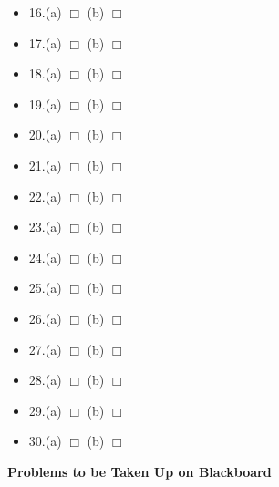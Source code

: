 \documentclass[12pt]{article}
\begin{document}
\begin{minipage}[t]{\textwidth}
\begin{multicols}{2}
\begin{mdframed}
\begin{multicols}{2}
\begin{itemize}
	\setlength\itemsep{0em}	
	\item{16.(a) $\Box$ \hspace{0.2cm} (b) $\Box$}
	\item{17.(a) $\Box$ \hspace{0.2cm} (b) $\Box$}
	\item{18.(a) $\Box$ \hspace{0.2cm} (b) $\Box$}
	\item{19.(a) $\Box$ \hspace{0.2cm} (b) $\Box$}
	\item{20.(a) $\Box$ \hspace{0.2cm} (b) $\Box$}
	\item{21.(a) $\Box$ \hspace{0.2cm} (b) $\Box$}
	\item{22.(a) $\Box$ \hspace{0.2cm} (b) $\Box$}
	\item{23.(a) $\Box$ \hspace{0.2cm} (b) $\Box$}
	\item{24.(a) $\Box$ \hspace{0.2cm} (b) $\Box$}
	\item{25.(a) $\Box$ \hspace{0.2cm} (b) $\Box$}
	\item{26.(a) $\Box$ \hspace{0.2cm} (b) $\Box$}
	\item{27.(a) $\Box$ \hspace{0.2cm} (b) $\Box$}
	\item{28.(a) $\Box$ \hspace{0.2cm} (b) $\Box$}
	\item{29.(a) $\Box$ \hspace{0.2cm} (b) $\Box$}
	\item{30.(a) $\Box$ \hspace{0.2cm} (b) $\Box$}
\end{itemize}
\vspace{0.5cm}

\columnbreak
\end{multicols}
\end{mdframed}

\columnbreak
\end{multicols}

\vspace{1.0cm}

\begin{mdframed}
\textbf{Problems to be Taken Up on Blackboard}


\end{mdframed}
\end{minipage}
\end{document}
